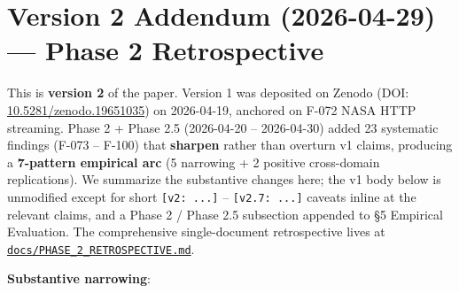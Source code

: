 \section{Version 2 Addendum (2026-04-29) --- Phase 2 Retrospective}\label{version-2-addendum-2026-04-29-phase-2-retrospective}

This is \textbf{version 2} of the paper. Version 1 was deposited on Zenodo
(DOI: \href{https://doi.org/10.5281/zenodo.19651035}{10.5281/zenodo.19651035})
on 2026-04-19, anchored on F-072 NASA HTTP streaming. Phase 2 + Phase 2.5
(2026-04-20 -- 2026-04-30) added 23 systematic findings (F-073 -- F-100)
that \textbf{sharpen} rather than overturn v1 claims, producing a \textbf{7-pattern
empirical arc} (5 narrowing + 2 positive cross-domain replications). We
summarize the substantive changes here; the v1 body below is unmodified
except for short \texttt{{[}v2:\ ...{]}} -- \texttt{{[}v2.7:\ ...{]}} caveats inline at the
relevant claims, and a Phase 2 / Phase 2.5 subsection appended to §5
Empirical Evaluation. The comprehensive single-document retrospective
lives at \href{../PHASE_2_RETROSPECTIVE.md}{\texttt{docs/PHASE\_2\_RETROSPECTIVE.md}}.

\textbf{Substantive narrowing}:


